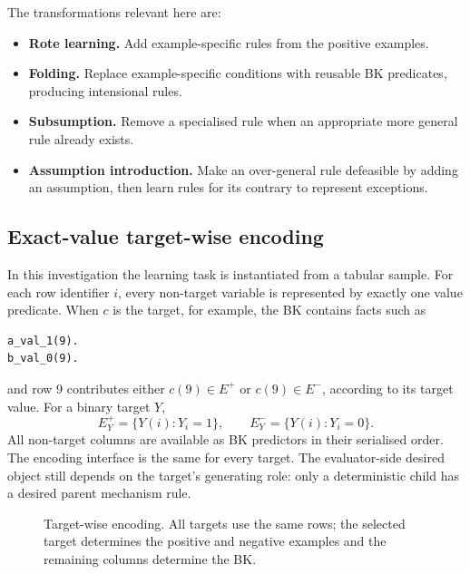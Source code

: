 \documentclass[11pt]{article}
\newcommand{\ABALearn}{\textsc{ABALearn}}
\newcommand{\Epos}{E^{+}}
\newcommand{\Eneg}{E^{-}}
\begin{document}
The transformations relevant here are:

\begin{itemize}
  \item \textbf{Rote learning.} Add example-specific rules from the positive
  examples.
  \item \textbf{Folding.} Replace example-specific conditions with reusable BK
  predicates, producing intensional rules.
  \item \textbf{Subsumption.} Remove a specialised rule when an appropriate more
  general rule already exists.
  \item \textbf{Assumption introduction.} Make an over-general rule defeasible by
  adding an assumption, then learn rules for its contrary to represent
  exceptions.
\end{itemize}

\subsection{Exact-value target-wise encoding}

In this investigation the learning task is instantiated from a tabular sample.
For each row identifier \(i\), every non-target variable is represented by
exactly one value predicate. When \(c\) is the target, for example, the BK
contains facts such as

\begin{lstlisting}
a_val_1(9).
b_val_0(9).
\end{lstlisting}

and row 9 contributes either \(c(9)\in\Epos\) or \(c(9)\in\Eneg\), according to
its target value. For a binary target \(Y\),
\[
\Epos_Y=\{Y(i):Y_i=1\},\qquad
\Eneg_Y=\{Y(i):Y_i=0\}.
\]
All non-target columns are available as BK predictors in their serialised
order. The encoding interface is the same for every target. The
evaluator-side desired object still depends on the target's generating role:
only a deterministic child has a desired parent mechanism rule.

\begin{figure}[ht]
\centering
{}
\caption{Target-wise encoding. All targets use the same rows; the selected
target determines the positive and negative examples and the remaining
columns determine the BK.}
\label{fig:targetwise-encoding}
\end{figure}
\end{document}
